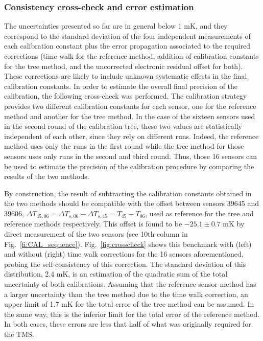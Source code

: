 \subsubsection{Consistency cross-check and error estimation} 
\label{sec:crossCheck}
\noindent The uncertainties presented so far are in general below 1 mK, and they correspond to the standard deviation of the four independent measurements of each calibration constant plus the error propagation associated to the required corrections (time-walk for the reference method, addition of calibration constants for the tree method, and the uncorrected electronic residual offset for both). These corrections are likely to include unknown systematic effects in the final calibration constants. In order to estimate the overall final precision of the calibration, the following cross-check was performed. The calibration strategy provides two different calibration constants for each sensor, one for the reference method and another for the tree method. In the case of the sixteen sensors used in the second round of the calibration tree, these two values are statistically independent of each other, since they rely on  different runs. Indeed, the reference method uses only the runs in the first round while the tree method for those sensors uses only runs in the second and third round. Thus, those 16 sensors can be used to estimate the precision of the calibration procedure by comparing the results of the two methods.

By construction, the result of subtracting the calibration constants obtained in the two methods should be compatible with the offset between sensors 39645 and 39606, $\Delta T_{45,06} = \Delta T_{s,06}-\Delta T_{s,45} = T_{45}-T_{06}$, used as reference for the tree and reference methods respectively. This offset is found to be $-25.1 \pm 0.7$ mK by direct measurement of the two sensors (see 10th column in Fig.~\ref{fi:CAL_sequence}).  Fig.~\ref{fig:crosscheck} shows this benchmark with (left) and without (right) time walk corrections for the 16 sensors aforementioned, probing the self-consistency of this correction. The standard deviation of this distribution, 2.4 mK, is an estimation of the quadratic sum of the total uncertainty of both calibrations. Assuming that the reference sensor method has a larger uncertainty than the tree method due to the time walk correction, an upper limit of 1.7 mK for the total error of the tree method can be assumed. In the same way, this is the inferior limit for the total error of the reference method. In both cases, these errors are less that half of what was originally required for the TMS.


